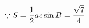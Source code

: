 \documentclass[preview]{standalone}
\begin{document}
\begin{align*}
\special{dvisvgm:raw <g id='unique000'>}\because S=\frac{1}{2}ac\sin B=\frac{\sqrt{7}}{4}\special{dvisvgm:raw </g>}
\end{align*}
\end{document}

